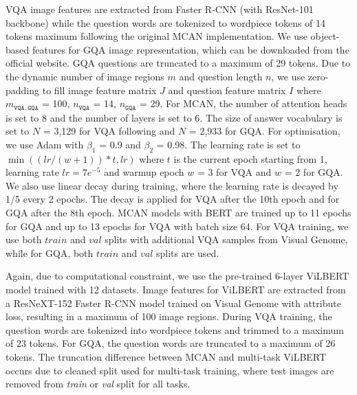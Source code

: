 \documentclass{article}
\begin{document}
VQA image features are extracted from Faster R-CNN (with ResNet-101 backbone) while the question words are tokenized to wordpiece tokens of 14 tokens maximum following the original MCAN implementation. We use object-based features for GQA image representation, which can be downloaded from the official website. %
GQA questions are truncated to a maximum of 29 tokens. Due to the dynamic number of image regions $m$ and question length $n$, we use zero-padding to fill image feature matrix $J$ and question feature matrix $I$ where $m_{\mathtt{VQA},\mathtt{GQA}}$ = 100, $n_{\mathtt{VQA}}$ = 14, $n_{\mathtt{GQA}}$ = 29. For MCAN, the number of attention heads is set to 8 and the number of layers is set to 6. The size of answer vocabulary is set to $N$ = 3,129 for VQA following \citet{yu2019mcan} and $N$ = 2,933 for GQA. For optimisation, we use Adam \citep{kingma2014adam} with $\beta_{1}$ = 0.9 and $\beta_{2}$ = 0.98. The learning rate is set to $\min( (lr/(w+1)) * t, lr)$ where $t$ is the current epoch starting from 1, learning rate $lr = 7e^{-5}$ and warmup epoch $w$ = 3 for VQA and $w$ = 2 for GQA. We also use linear decay during training, where the learning rate is decayed by 1/5 every 2 epochs. The decay is applied for VQA after the 10th epoch and for GQA after the 8th epoch. MCAN models with BERT are trained up to 11 epochs for GQA and up to 13 epochs for VQA with batch size 64. For VQA training, we use both $train$ and $val$ splits with additional VQA samples from Visual Genome, while for GQA, both $train$ and $val$ splits are used.

Again, due to computational constraint, we use the pre-trained 6-layer ViLBERT model trained with 12 datasets. Image features for ViLBERT are extracted from a ResNeXT-152 \citep{Xie2016} Faster R-CNN model trained on Visual Genome with attribute loss, resulting in a maximum of 100 image regions. During VQA training, the question words are tokenized into wordpiece tokens and trimmed to a maximum of 23 tokens. For GQA, the question words are truncated to a maximum of 26 tokens. The truncation difference between MCAN and multi-task ViLBERT occurs due to cleaned split used for multi-task training, where test images are removed from \textit{train} or \textit{val} split for all tasks.

\end{document}
